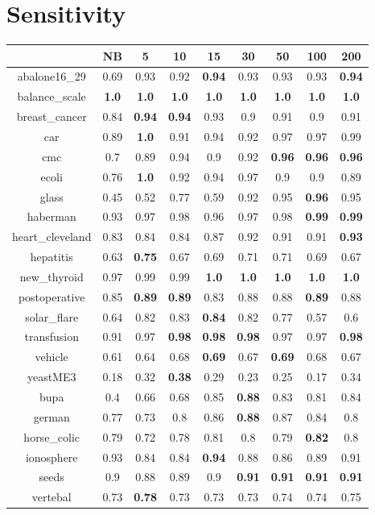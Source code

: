 \documentclass{article}%
\begin{document}
%
\section*{Sensitivity}%
\begin{tabular}{c|cccccccc}%
\hline%
&NB&5&10&15&30&50&100&200\\%
\hline%
abalone16\_29&0.69&0.93&0.92&\textbf{0.94}&0.93&0.93&0.93&\textbf{0.94}\\%
\hline%
balance\_scale&\textbf{1.0}&\textbf{1.0}&\textbf{1.0}&\textbf{1.0}&\textbf{1.0}&\textbf{1.0}&\textbf{1.0}&\textbf{1.0}\\%
\hline%
breast\_cancer&0.84&\textbf{0.94}&\textbf{0.94}&0.93&0.9&0.91&0.9&0.91\\%
\hline%
car&0.89&\textbf{1.0}&0.91&0.94&0.92&0.97&0.97&0.99\\%
\hline%
cmc&0.7&0.89&0.94&0.9&0.92&\textbf{0.96}&\textbf{0.96}&\textbf{0.96}\\%
\hline%
ecoli&0.76&\textbf{1.0}&0.92&0.94&0.97&0.9&0.9&0.89\\%
\hline%
glass&0.45&0.52&0.77&0.59&0.92&0.95&\textbf{0.96}&0.95\\%
\hline%
haberman&0.93&0.97&0.98&0.96&0.97&0.98&\textbf{0.99}&\textbf{0.99}\\%
\hline%
heart\_cleveland&0.83&0.84&0.84&0.87&0.92&0.91&0.91&\textbf{0.93}\\%
\hline%
hepatitis&0.63&\textbf{0.75}&0.67&0.69&0.71&0.71&0.69&0.67\\%
\hline%
new\_thyroid&0.97&0.99&0.99&\textbf{1.0}&\textbf{1.0}&\textbf{1.0}&\textbf{1.0}&\textbf{1.0}\\%
\hline%
postoperative&0.85&\textbf{0.89}&\textbf{0.89}&0.83&0.88&0.88&\textbf{0.89}&0.88\\%
\hline%
solar\_flare&0.64&0.82&0.83&\textbf{0.84}&0.82&0.77&0.57&0.6\\%
\hline%
transfusion&0.91&0.97&\textbf{0.98}&\textbf{0.98}&\textbf{0.98}&0.97&0.97&\textbf{0.98}\\%
\hline%
vehicle&0.61&0.64&0.68&\textbf{0.69}&0.67&\textbf{0.69}&0.68&0.67\\%
\hline%
yeastME3&0.18&0.32&\textbf{0.38}&0.29&0.23&0.25&0.17&0.34\\%
\hline%
bupa&0.4&0.66&0.68&0.85&\textbf{0.88}&0.83&0.81&0.84\\%
\hline%
german&0.77&0.73&0.8&0.86&\textbf{0.88}&0.87&0.84&0.8\\%
\hline%
horse\_colic&0.79&0.72&0.78&0.81&0.8&0.79&\textbf{0.82}&0.8\\%
\hline%
ionosphere&0.93&0.84&0.84&\textbf{0.94}&0.88&0.86&0.89&0.91\\%
\hline%
seeds&0.9&0.88&0.89&0.9&\textbf{0.91}&\textbf{0.91}&\textbf{0.91}&\textbf{0.91}\\%
\hline%
vertebal&0.73&\textbf{0.78}&0.73&0.73&0.73&0.74&0.74&0.75\\%
\hline%
\end{tabular}
\end{document}
